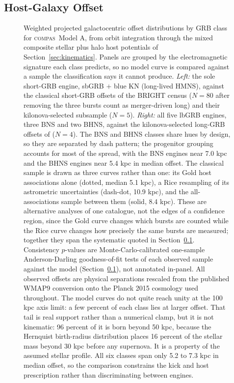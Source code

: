 \documentclass[twocolumn,apj]{openjournal}
\newcommand{\compas}{\textsc{compas}}
\begin{document}
\subsection{Host-Galaxy Offset} \label{sec:offset2}
\begin{figure}[!tbp]
\caption{Weighted projected galactocentric offset distributions by GRB class
for \compas\ Model A, from orbit integration through the mixed composite
\citet{hernquist1990} stellar plus \citet{navarro1997} halo host potentials of
Section~\ref{sec:kinematics}. Panels
are grouped by the electromagnetic signature each class predicts, so no model
curve is compared against a sample the classification says it cannot produce.
\emph{Left:} the sole short-GRB engine, sbGRB $+$ blue KN (long-lived HMNS),
against the classical short-GRB offsets of the \citet{fong2022} BRIGHT census
($N = 80$ after removing the three bursts \citet{skobe2026} count as
merger-driven long) and their kilonova-selected subsample ($N = 5$).
\emph{Right:} all five lbGRB engines, three BNS and two BHNS, against the
kilonova-selected long-GRB offsets of \citet{skobe2026} ($N = 4$). The BNS and
BHNS classes share hues by design, so they are separated by dash pattern; the
progenitor grouping accounts for most of the spread, with the BNS engines near
7.0 kpc and the BHNS engines near 5.4 kpc in median offset. The
classical sample is drawn as three curves rather than one: its Gold host
associations alone (dotted, median 5.1 kpc), a Rice resampling of its
astrometric uncertainties (dash-dot, 10.9 kpc), and the all-associations sample
between them (solid, 8.4 kpc). These are alternative analyses of one catalogue,
not the edges of a confidence region, since the Gold curve changes which bursts
are counted while the Rice curve changes how precisely the same bursts are
measured; together they span the systematic quoted in
Section~\ref{sec:offset2}. Consistency
$p$-values are Monte-Carlo-calibrated one-sample Anderson-Darling
goodness-of-fit tests of each observed sample against the model
(Section~\ref{sec:offset2}), not annotated in-panel. All observed offsets are
physical separations rescaled from the published WMAP9 conversion onto the
Planck 2015 cosmology used throughout. The model curves do not quite reach unity
at the 100 kpc axis limit: a few percent of each class lies at larger offset.
That tail is real support rather than a numerical clamp, but it is not
kinematic: 96 percent of it is born beyond 50 kpc, because the Hernquist
birth-radius distribution places 16 percent of the stellar mass beyond 30 kpc
before any supernova. It is a property of the assumed stellar profile.
All six classes span only 5.2 to 7.3 kpc in median offset, so the
comparison constrains the kick and host prescription rather than discriminating
between engines. \label{fig:offsets}}
\end{figure}
\end{document}
